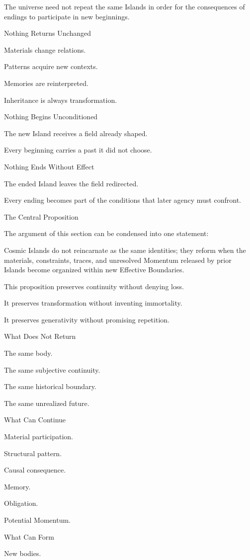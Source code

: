 The universe need not repeat the same Islands in order for the consequences of endings to participate in new beginnings.

Nothing Returns Unchanged

Materials change relations.

Patterns acquire new contexts.

Memories are reinterpreted.

Inheritance is always transformation.

Nothing Begins Unconditioned

The new Island receives a field already shaped.

Every beginning carries a past it did not choose.

Nothing Ends Without Effect

The ended Island leaves the field redirected.

Every ending becomes part of the conditions that later agency must confront.

The Central Proposition

The argument of this section can be condensed into one statement:

Cosmic Islands do not reincarnate as the same identities; they reform when the materials, constraints, traces, and unresolved Momentum released by prior Islands become organized within new Effective Boundaries.

This proposition preserves continuity without denying loss.

It preserves transformation without inventing immortality.

It preserves generativity without promising repetition.

What Does Not Return

The same body.

The same subjective continuity.

The same historical boundary.

The same unrealized future.

What Can Continue

Material participation.

Structural pattern.

Causal consequence.

Memory.

Obligation.

Potential Momentum.

What Can Form

New bodies.


